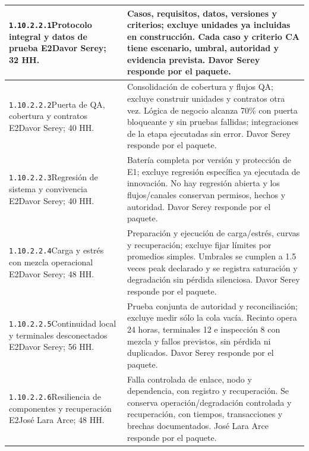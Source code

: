 \begin{longtable}{L{52mm}L{91mm}}
\texttt{1.\allowbreak{}10.\allowbreak{}2.\allowbreak{}2.\allowbreak{}1}\newline Protocolo integral y datos de prueba E2\newline Davor Serey; 32 HH. & Casos, requisitos, datos, versiones y criterios; excluye unidades ya incluidas en construcción. Cada caso y criterio CA tiene escenario, umbral, autoridad y evidencia prevista. Davor Serey responde por el paquete.\\\hline
\texttt{1.\allowbreak{}10.\allowbreak{}2.\allowbreak{}2.\allowbreak{}2}\newline Puerta de QA, cobertura y contratos E2\newline Davor Serey; 40 HH. & Consolidación de cobertura y flujos QA; excluye construir unidades y contratos otra vez. Lógica de negocio alcanza 70\% con puerta bloqueante y sin pruebas fallidas; integraciones de la etapa ejecutadas sin error. Davor Serey responde por el paquete.\\\hline
\texttt{1.\allowbreak{}10.\allowbreak{}2.\allowbreak{}2.\allowbreak{}3}\newline Regresión de sistema y convivencia E2\newline Davor Serey; 40 HH. & Batería completa por versión y protección de E1; excluye regresión específica ya ejecutada de innovación. No hay regresión abierta y los flujos/canales conservan permisos, hechos y autoridad. Davor Serey responde por el paquete.\\\hline
\texttt{1.\allowbreak{}10.\allowbreak{}2.\allowbreak{}2.\allowbreak{}4}\newline Carga y estrés con mezcla operacional E2\newline Davor Serey; 48 HH. & Preparación y ejecución de carga/estrés, curvas y recuperación; excluye fijar límites por promedios simples. Umbrales se cumplen a 1.5 veces peak declarado y se registra saturación y degradación sin pérdida silenciosa. Davor Serey responde por el paquete.\\\hline
\texttt{1.\allowbreak{}10.\allowbreak{}2.\allowbreak{}2.\allowbreak{}5}\newline Continuidad local y terminales desconectados E2\newline Davor Serey; 56 HH. & Prueba conjunta de autoridad y reconciliación; excluye medir sólo la cola vacía. Recinto opera 24 horas, terminales 12 e inspección 8 con mezcla y fallos previstos, sin pérdida ni duplicados. Davor Serey responde por el paquete.\\\hline
\texttt{1.\allowbreak{}10.\allowbreak{}2.\allowbreak{}2.\allowbreak{}6}\newline Resiliencia de componentes y recuperación E2\newline José Lara Arce; 48 HH. & Falla controlada de enlace, nodo y dependencia, con registro y recuperación. Se conserva operación/degradación controlada y recuperación, con tiempos, transacciones y brechas documentados. José Lara Arce responde por el paquete.\\\hline

\end{longtable}
